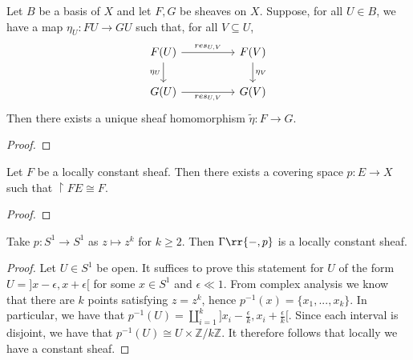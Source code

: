 \documentclass{article}
\begin{document}
\begin{lemma}
  Let $B$ be a basis of $X$ and let $F,G$ be sheaves on $X$. Suppose, for all $U\in B$,
  we have a map $\eta_U:FU\to GU$ such that, for all $V\subseteq U$,
  \begin{equation}
    \begin{tikzcd}
      F(U) && F(V) \\
      G(U) && G(V)
      \arrow["res_{U,V}", from=1-1, to=1-3]
      \arrow["{\eta_U}"', from=1-1, to=2-1]
      \arrow["{\eta_V}", from=1-3, to=2-3]
      \arrow["res_{U,V}"', from=2-1, to=2-3]
    \end{tikzcd}
  \end{equation}
  Then there exists a unique sheaf homomorphism $\tilde\eta : F\to G$.
  \begin{proof}
    \missingproof
  \end{proof}
\end{lemma}

\begin{theorem}
  Let $F$ be a locally constant sheaf. Then there exists a covering space
  $p:E\to X$ such that $\restriction{F}{E} \cong F$.
  \begin{proof}
    \missingproof
  \end{proof}
\end{theorem}

\begin{example}
  Take $p:S^1 \to S^1$ as $z\mapsto z^k$ for $k\geq 2$.
  Then $\Gamma\rr{-,p}$ is a locally constant sheaf.
  \begin{proof}
    Let $U \in S^1$ be open. It suffices to prove this statement for $U$ of the 
    form $U = ]x - \epsilon, x + \epsilon[$ for some $x \in S^1$ and $\epsilon \ll 1$. 
    From complex analysis we know that there are $k$ points satisfying $z = z^k$, 
    hence $p^{-1}(x) = \{x_1, ..., x_k\}$. In particular, we have that 
    $p^{-1}(U) = \amalg_{i=1}^k ]x_i - \frac{\epsilon}{k}, x_i + \frac{\epsilon}{k}[$. 
    Since each interval is disjoint, we have that $p^{-1}(U) \cong U \times \mathbb{Z}/k\mathbb{Z}$. 
    It therefore follows that locally we have a constant sheaf.
    \missingproof
  \end{proof}
\end{example}
\end{document}
